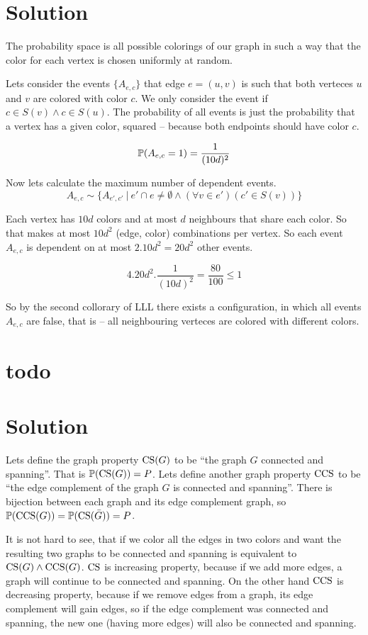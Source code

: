 \documentclass[a4paper]{article}
\begin{document}
\section{Solution}

The probability space is all possible colorings of our graph in such a way that
the color for each vertex is chosen uniformly at random.

Lets consider the events $ \{ A_{e,c} \} $ that edge $ e = (u, v) $ is such
that both verteces $ u $ and $ v $ are colored with color $ c $. We only
consider the event if $ c \in S(v) \land c \in S(u) $. The probability of all
events is just the probability that a vertex has a given color, squared --
because both endpoints should have color $ c $.

$$
  \P(A_{e,c} = 1) = \frac{1}{(10d)^2}
$$

Now lets calculate the maximum number of dependent events.
$$
  A_{e,c} \sim \{ A_{e',c'}\ |\ e' \cap e \ne \emptyset \land (\forall v \in e')(c' \in S(v)) \}
$$

Each vertex has $ 10d $ colors and at most $ d $ neighbours that share each
color. So that makes at most $ 10d^2 $ (edge, color) combinations per vertex.
So each event $ A_{e,c} $ is dependent on at most $ 2 . 10d^2 = 20 d^2 $ other
events.

$$
  4. 20 d^2 . \frac{1}{(10d)^2} = \frac{80}{100} \le 1
$$

So by the second collorary of LLL there exists a configuration, in which all
events $ A_{e,c} $ are false, that is -- all neighbouring verteces are colored
with different colors. \endproof

\section{todo}

\section{Solution}

Lets define the graph property $ \CS(G) $ to be ``the graph $ G $ connected and spanning''. That
is $ \P(\CS(G)) = P $.
Lets define another graph property $ \CCS $ to be ``the edge complement of the
graph $ G $ is connected and spanning''. There is bijection between each graph
and its edge complement graph, so $ \P(\CCS(G)) = \P(\CS(\bar G)) = P $.

It is not hard to see, that if we color all the edges in two colors and want
the resulting two graphs to be connected and spanning is equivalent to $ \CS(G)
\land \CCS(G) $. $ \CS $ is increasing property, because if we add more edges,
a graph will continue to be connected and spanning. On the other hand $ \CCS
$ is decreasing property, because if we remove edges from a graph, its edge
complement will gain edges, so if the edge complement was connected and
spanning, the new one (having more edges) will also be connected and spanning.
\end{document}
